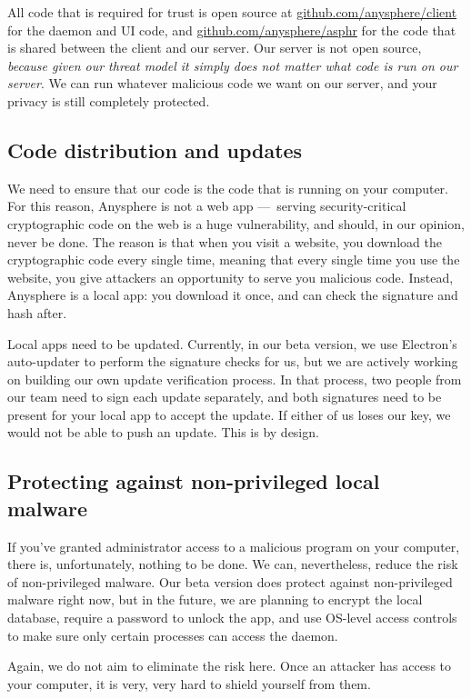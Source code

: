 All code that is required for trust is open source at \href{https://github.com/anysphere/client}{github.com/anysphere/client} for the daemon and UI code, and \href{https://github.com/anysphere/asphr}{github.com/anysphere/asphr} for the code that is shared between the client and our server. Our server is not open source, \textit{because given our threat model it simply does not matter what code is run on our server}. We can run whatever malicious code we want on our server, and your privacy is still completely protected.

\subsection{Code distribution and updates}

We need to ensure that our code is the code that is running on your computer. For this reason, Anysphere is not a web app — serving security-critical cryptographic code on the web is a huge vulnerability, and should, in our opinion, never be done. The reason is that when you visit a website, you download the cryptographic code every single time, meaning that every single time you use the website, you give attackers an opportunity to serve you malicious code. Instead, Anysphere is a local app: you download it once, and can check the signature and hash after.

Local apps need to be updated. Currently, in our beta version, we use Electron's auto-updater to perform the signature checks for us, but we are actively working on building our own update verification process. In that process, two people from our team need to sign each update separately, and both signatures need to be present for your local app to accept the update. If either of us loses our key, we would not be able to push an update. This is by design.

\subsection{Protecting against non-privileged local malware}

If you've granted administrator access to a malicious program on your computer, there is, unfortunately, nothing to be done. We can, nevertheless, reduce the risk of non-privileged malware. Our beta version does protect against non-privileged malware right now, but in the future, we are planning to encrypt the local database, require a password to unlock the app, and use OS-level access controls to make sure only certain processes can access the daemon.

Again, we do not aim to eliminate the risk here. Once an attacker has access to your computer, it is very, very hard to shield yourself from them.